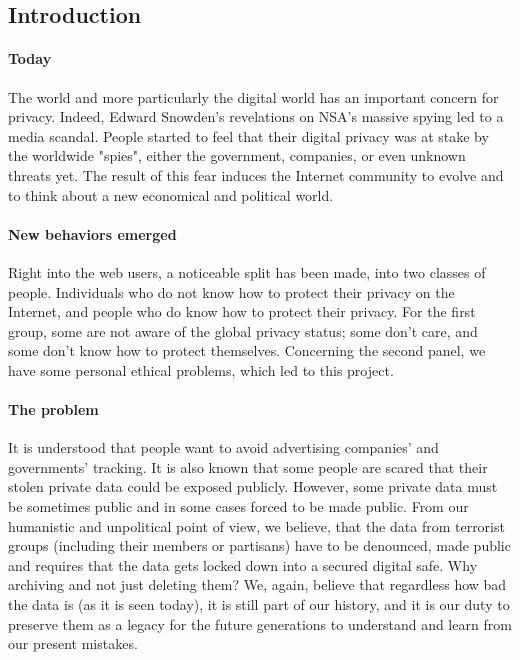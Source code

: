 
\subsection{Introduction}
\paragraph{Today} The world and more particularly the digital world has an important concern for privacy. Indeed, Edward Snowden's revelations on NSA's massive spying\cite{EdwardSnowdenArchive} led to a media scandal. People started to feel that their digital privacy was at stake by the worldwide "spies", either the government, companies, or even unknown threats yet. The result of this fear induces the Internet community to evolve and to think about a new economical and political world.

\paragraph{New behaviors emerged} Right into the web users, a noticeable split has been made, into two classes of people. Individuals who do not know how to protect their privacy on the Internet, and people who do know how to protect their privacy. For the first group, some are not aware of the global privacy status; some don't care, and some don't know how to protect themselves. Concerning the second panel, we have some personal ethical problems, which led to this project.

\paragraph{The problem} It is understood that people want to avoid advertising companies' and governments' tracking. It is also known that some people are scared that their stolen private data could be exposed publicly. However, some private data must be sometimes public and in some cases forced to be made public. From our humanistic and unpolitical point of view, we believe, that the data from terrorist groups (including their members or partisans) have to be denounced, made public and requires that the data gets locked down into a secured digital safe. Why archiving and not just deleting them? We, again, believe that regardless how bad the data is (as it is seen today), it is still part of our history, and it is our duty to preserve them as a legacy for the future generations to understand and learn from our present mistakes.


